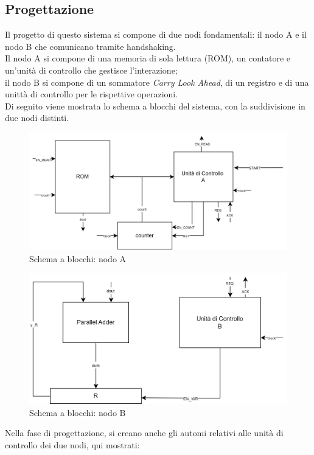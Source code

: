 \subsection{Progettazione}
Il progetto di questo sistema si compone di due nodi fondamentali: il nodo A e il nodo B che comunicano tramite handshaking.\\
Il nodo A si compone di una memoria di sola lettura (ROM), un contatore e un'unità di controllo che gestisce l'interazione;\\
il nodo B si compone di un sommatore \textit{Carry Look Ahead}, di un registro e di una unittà di controllo per le rispettive operazioni.\\
Di seguito viene mostrata lo schema a blocchi del sistema, con la suddivisione in due nodi distinti.
\begin{figure}[H]
	\centering
	\includegraphics[width=1\textwidth]{img/preappDicembre/Preapp_NodoA}
	\caption{Schema a blocchi: nodo A}
	\label{wf_preapp} 
\end{figure}
\begin{figure}[H]
	\centering
	\includegraphics[width=1\textwidth]{img/preappDicembre/Preapp_NodoB}
	\caption{Schema a blocchi: nodo B}
	\label{wf_preapp} 
\end{figure}
Nella fase di progettazione, si creano anche gli automi relativi alle unità di controllo dei due nodi, qui mostrati:
